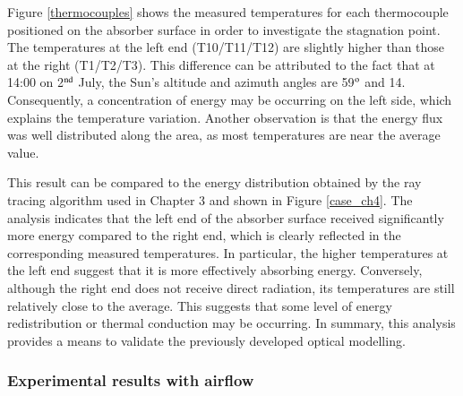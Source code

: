 
Figure \ref{thermocouples} shows the measured temperatures for each thermocouple positioned on the absorber surface in order to investigate the stagnation point. The temperatures at the left end (T10/T11/T12) are slightly higher than those at the right (T1/T2/T3). This difference can be attributed to the fact that at 14:00 on 2$^{\rm nd}$ July, the Sun's altitude and azimuth angles are 59$^{\rm o}$ and 14\textdegree. Consequently, a concentration of energy may be occurring on the left side, which explains the temperature variation. Another observation is that the energy flux was well distributed along the area, as most temperatures are near the average value.


This result can be compared to the energy distribution obtained by the ray tracing algorithm used in Chapter 3 and shown in Figure \ref{case_ch4}. The analysis indicates that the left end of the absorber surface received significantly more energy compared to the right end, which is clearly reflected in the corresponding measured temperatures. In particular, the higher temperatures at the left end suggest that it is more effectively absorbing energy. Conversely, although the right end does not receive direct radiation, its temperatures are still relatively close to the average. This suggests that some level of energy redistribution or thermal conduction may be occurring. In summary, this analysis provides a means to validate the previously developed optical modelling.


\newpage
\subsubsection{Experimental results with airflow}

